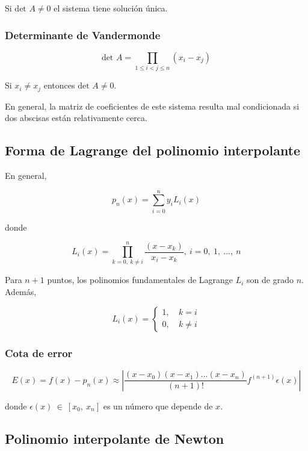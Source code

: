 \documentclass{article}
\begin{document}
Si $\text{det } A \neq 0$ el sistema tiene solución única.

\subsubsection{Determinante de Vandermonde}

\begin{equation*}
    \text{det } A = \prod_{1\leq i < j \leq n} \left(x_i - x_j\right)
\end{equation*}

Si $x_i\neq x_j$ entonces $\text{det } A \neq 0$.

En general, la matriz de coeficientes de este sistema resulta mal condicionada
si dos abscisas están relativamente cerca.

\subsection{Forma de Lagrange del polinomio interpolante}

En general, 

\[p_n(x) = \sum_{i=0}^{n} y_iL_i(x)\]

donde

\[ L_i(x) = \prod_{k=0,\ k\neq i}^{n} \frac{\left(x-x_k\right)}{x_i-x_k},\ i = 0,\ 1,\ ...,\ n\]

Para $n+1$ puntos, los polinomios fundamentales de Lagrange $L_i$ son de grado
$n$. Además, 

\begin{equation*}
    L_i(x) = \begin{cases}
        1,\ &k=i \\
        0,\ &k\neq i
    \end{cases}
\end{equation*}

\subsubsection{Cota de error}

\[ E(x) = f(x) - p_n(x) \approx \left| \frac{(x-x_0)(x-x_1)...(x-x_n)}{(n+1)!} f^{(n+1)} \epsilon(x) \right| \]

donde $\epsilon(x)\ \in\ \left[ x_0,\ x_n \right]$  es un número que depende de 
$x$.

\subsection{Polinomio interpolante de Newton}
\end{document}
